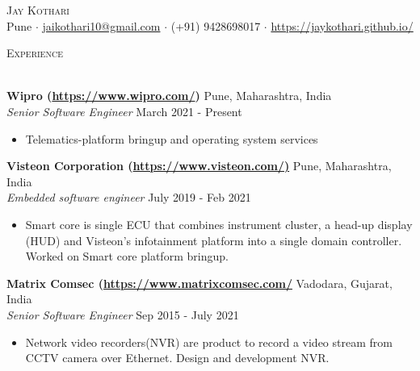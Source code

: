 \documentclass[a4paper]{article}
\newcommand{\lineunder} {
    \vspace*{-8pt} \\
    \hspace*{-18pt} \hrulefill \\
}
\newcommand{\header} [1] {
    {\hspace*{-18pt}\vspace*{6pt} \textsc{#1}}
    \vspace*{-6pt} \lineunder
}
\begin{document}
\vspace*{-40pt}

    

\vspace*{-10pt}
\begin{center}
	{\Huge \scshape {Jay Kothari}}\\
	Pune $\cdot$ \url{jaikothari10@gmail.com} $\cdot$ (+91) 9428698017 $\cdot$ \url{https://jaykothari.github.io/}\\
\end{center}

\header{Experience}
\vspace{1mm}

\textbf{Wipro (\url{https://www.wipro.com/})} \hfill Pune, Maharashtra, India\\
\textit{Senior Software Engineer} \hfill March 2021 - Present\\
\vspace{-1mm}
\begin{itemize} \itemsep 1pt
	\item Telematics-platform bringup and operating system services
\end{itemize}

\textbf{Visteon Corporation (\url{https://www.visteon.com/)}} \hfill Pune, Maharashtra, India\\
\textit{Embedded software engineer} \hfill July 2019 - Feb 2021\\
\vspace{-1mm}
\begin{itemize} \itemsep 1pt
	\item Smart core is single ECU that combines instrument cluster, a head-up display (HUD) and Visteon’s infotainment platform into a single domain controller. Worked on Smart core platform bringup. 
\end{itemize}

\textbf{Matrix Comsec (\url{https://www.matrixcomsec.com/}} \hfill Vadodara, Gujarat, India\\
\textit{Senior Software Engineer} \hfill Sep 2015 - July 2021\\
\vspace{-1mm}
\begin{itemize} \itemsep 1pt
	\item Network video recorders(NVR) are product to record a video stream from CCTV camera over Ethernet. Design and development NVR.
\end{itemize}
\end{document}
